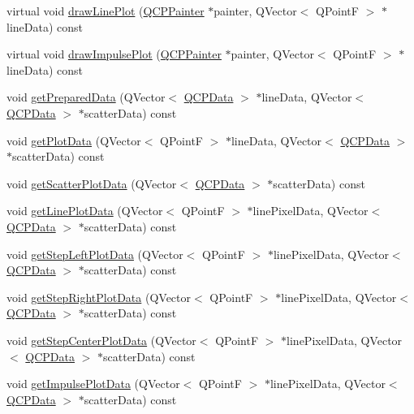 \begin{DoxyCompactItemize}
\item 
virtual void \hyperlink{classQCPGraph_acebc22c3385829b19a87e6281fe6ade2}{draw\+Line\+Plot} (\hyperlink{classQCPPainter}{Q\+C\+P\+Painter} $\ast$painter, Q\+Vector$<$ Q\+PointF $>$ $\ast$line\+Data) const 
\item 
virtual void \hyperlink{classQCPGraph_abc01180629621f1e47e94559227d3d8c}{draw\+Impulse\+Plot} (\hyperlink{classQCPPainter}{Q\+C\+P\+Painter} $\ast$painter, Q\+Vector$<$ Q\+PointF $>$ $\ast$line\+Data) const 
\item 
void \hyperlink{classQCPGraph_ab420b46ba638dc3252439fe16687b244}{get\+Prepared\+Data} (Q\+Vector$<$ \hyperlink{classQCPData}{Q\+C\+P\+Data} $>$ $\ast$line\+Data, Q\+Vector$<$ \hyperlink{classQCPData}{Q\+C\+P\+Data} $>$ $\ast$scatter\+Data) const 
\item 
void \hyperlink{classQCPGraph_a466c661e015188971c862031af946693}{get\+Plot\+Data} (Q\+Vector$<$ Q\+PointF $>$ $\ast$line\+Data, Q\+Vector$<$ \hyperlink{classQCPData}{Q\+C\+P\+Data} $>$ $\ast$scatter\+Data) const 
\item 
void \hyperlink{classQCPGraph_a45c4214b59ea11aa6d8d112bdc3b0e03}{get\+Scatter\+Plot\+Data} (Q\+Vector$<$ \hyperlink{classQCPData}{Q\+C\+P\+Data} $>$ $\ast$scatter\+Data) const 
\item 
void \hyperlink{classQCPGraph_ae3d82ffd0c9a883482aabf47b0e6b5ee}{get\+Line\+Plot\+Data} (Q\+Vector$<$ Q\+PointF $>$ $\ast$line\+Pixel\+Data, Q\+Vector$<$ \hyperlink{classQCPData}{Q\+C\+P\+Data} $>$ $\ast$scatter\+Data) const 
\item 
void \hyperlink{classQCPGraph_a609cf4a78045b4d2a679bdff7623847e}{get\+Step\+Left\+Plot\+Data} (Q\+Vector$<$ Q\+PointF $>$ $\ast$line\+Pixel\+Data, Q\+Vector$<$ \hyperlink{classQCPData}{Q\+C\+P\+Data} $>$ $\ast$scatter\+Data) const 
\item 
void \hyperlink{classQCPGraph_a3b9b8c8dc7a6fd9be6e253c25ee31809}{get\+Step\+Right\+Plot\+Data} (Q\+Vector$<$ Q\+PointF $>$ $\ast$line\+Pixel\+Data, Q\+Vector$<$ \hyperlink{classQCPData}{Q\+C\+P\+Data} $>$ $\ast$scatter\+Data) const 
\item 
void \hyperlink{classQCPGraph_ad3713e7d8eb85a0afc34a81a5db5cd27}{get\+Step\+Center\+Plot\+Data} (Q\+Vector$<$ Q\+PointF $>$ $\ast$line\+Pixel\+Data, Q\+Vector$<$ \hyperlink{classQCPData}{Q\+C\+P\+Data} $>$ $\ast$scatter\+Data) const 
\item 
void \hyperlink{classQCPGraph_a1ca2b0762505767f116892609fb02062}{get\+Impulse\+Plot\+Data} (Q\+Vector$<$ Q\+PointF $>$ $\ast$line\+Pixel\+Data, Q\+Vector$<$ \hyperlink{classQCPData}{Q\+C\+P\+Data} $>$ $\ast$scatter\+Data) const 

\end{DoxyCompactItemize}

